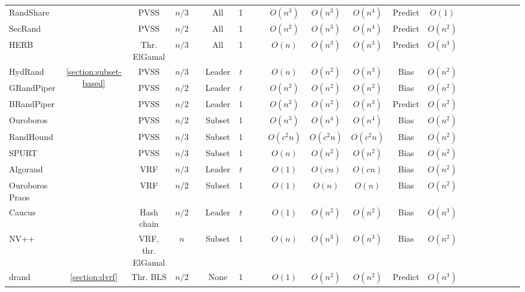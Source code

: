 \documentclass[letterpaper,twocolumn,10pt]{article}
\newcommand{\cmark}{\ding{51}}
\newcommand{\xmark}{\ding{55}}
\theoremstyle{definition}
\theoremstyle{remark}
\begin{document}
\begin{table*}[pt]
\begin{threeparttable}
\begin{tabularx}{\textwidth}{@{} l *{20}c}
RandShare &  & PVSS & $n/3$   & \xmark   & All   & 1   & \cmark    & \cmark   & $O(n^3)$  & $O(n^3)$   & $O(n^4)$  & Predict & $O(1)$ \\ 
SecRand &  & PVSS &  $n/2$  & \xmark   & All   & 1   & \cmark    & \cmark   & $O(n^2)$  & $O(n^3)$   & $O(n^4)$  & Predict & $O(n^2)$ \\ 
HERB &  & Thr. ElGamal & $n/3$   & \xmark   & All   & 1   & \cmark    & \cmark   & $O(n)$  & $O(n^3)$   & $O(n^3)$  & Predict & $O(n^3)$ \\ 
\midrule
HydRand & \multirow{10}{*}{\ref{section:subset-based}} & PVSS & $n/3$   & \xmark   & Leader   & $t$   & \cmark    & \xmark   & $O(n)$  & $O(n^2)$   & $O(n^3)$  & Bias & $O(n^2)$ \\ 
GRandPiper &  & PVSS  & $n/2$   & \xmark   & Leader   & $t$   & \cmark    & \xmark   & $O(n^2)$  & $O(n^2)$   & $O(n^2)$  & Bias & $O(n^2)$ \\ 
BRandPiper &  & PVSS  & $n/2$   & \xmark   & Leader   & 1   & \cmark    & \cmark   & $O(n^2)$  & $O(n^2)$   & $O(n^3)$  & Predict & $O(n^2)$ \\ 
Ouroboros &  & PVSS & $n/2$   & \xmark   & Subset   & 1   & \cmark    & \xmark   & $O(n^3)$  & $O(n^4)$   & $O(n^4)$  & Bias & $O(n^2)$ \\ 
RandHound &  & PVSS & $n/3$   & \xmark   & Subset   & 1   & \xmark    & \xmark   & $O(c^2 n)$  & $O(c^2n)$   & $O(c^2n)$  & Bias & $O(n^2)$ \\ 
SPURT &  & PVSS  & $n/3$   & \xmark   & Subset   & 1   & \cmark    & \xmark   & $O(n)$  & $O(n^2)$   & $O(n^2)$  & Bias & $O(n^2)$ \\ 
Algorand &  & VRF  & $n/3$   & \cmark    & Leader   & $t$   & \xmark    & \cmark   & $O(1)$  & $O(cn)$   & $O(cn)$  & Bias & $O(n^2)$ \\ 
Ouroboros Praos &  & VRF & $n/2$   & \cmark    & Subset   & 1   & \xmark    & \cmark   & $O(1)$  & $O(n)$   & $O(n)$  & Bias & $O(n^2)$ \\ 
Caucus &  & Hash chain &  $n/2$  & \cmark    & Leader   & $t$   & \xmark    & \cmark   & $O(1)$  & $O(n^2)$   & $O(n^2)$  & Bias & $O(n^3)$ \\ 
NV++ &  & VRF, thr. ElGamal &  $n$  & \xmark   & Subset   & $1$   & \xmark    & \cmark   & $O(n)$  & $O(n^3)$   & $O(n^3)$  & Bias & $O(n^2)$ \\ 
\midrule
drand & \multirow{4}{*}{\ref{section:dvrf}} & Thr. BLS & $n/2$   & \xmark   & None   & 1   & \cmark    & \cmark   & $O(1)$  & $O(n^2)$   & $O(n^2)$  & Predict & $O(n^3)$ \\ 

\end{tabularx}
\end{threeparttable}
\end{table*}
\end{document}
